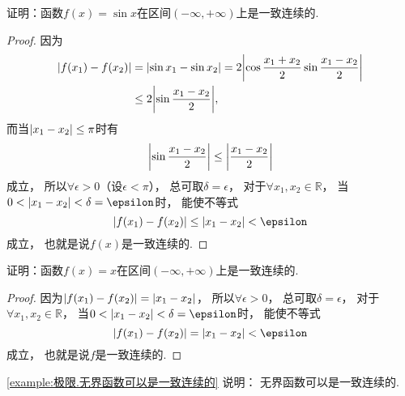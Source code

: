 \begin{example}
证明：函数\(f(x)=\sin x\)在区间\((-\infty,+\infty)\)上是一致连续的.
\begin{proof}
因为\begin{align*}
	\abs{f(x_1)-f(x_2)}
	&= \abs{\sin x_1 - \sin x_2}
	= 2\abs{\cos\frac{x_1+x_2}{2} \sin\frac{x_1-x_2}{2}} \\
	&\leq 2\abs{\sin\frac{x_1-x_2}{2}},
\end{align*}
而当\(\abs{x_1-x_2} \leq \pi\)时有\begin{equation*}
	\abs{\sin\frac{x_1-x_2}{2}} \leq \abs{\frac{x_1-x_2}{2}}
\end{equation*}成立，
所以\(\forall\epsilon>0\)（设\(\epsilon<\pi\)），
总可取\(\delta=\epsilon\)，
对于\(\forall x_1,x_2\in\mathbb{R}\)，
当\(0<\abs{x_1-x_2}<\delta=\epsilon\)时，
能使不等式\begin{equation*}
	\abs{f(x_1)-f(x_2)} \leq \abs{x_1-x_2} < \epsilon
\end{equation*}成立，
也就是说\(f(x)\)是一致连续的.
\end{proof}
\end{example}

\begin{example}\label{example:极限.无界函数可以是一致连续的}
证明：函数\(f(x)=x\)在区间\((-\infty,+\infty)\)上是一致连续的.
\begin{proof}
因为\(\abs{f(x_1)-f(x_2)}=\abs{x_1-x_2}\)，
所以\(\forall\epsilon>0\)，
总可取\(\delta=\epsilon\)，
对于\(\forall x_1,x_2\in\mathbb{R}\)，
当\(0<\abs{x_1-x_2}<\delta=\epsilon\)时，
能使不等式\begin{equation*}
	\abs{f(x_1)-f(x_2)} = \abs{x_1-x_2} < \epsilon
\end{equation*}成立，
也就是说\(f\)是一致连续的.
\end{proof}
\end{example}
\begin{remark}
\cref{example:极限.无界函数可以是一致连续的} 说明：
无界函数可以是一致连续的.
\end{remark}

